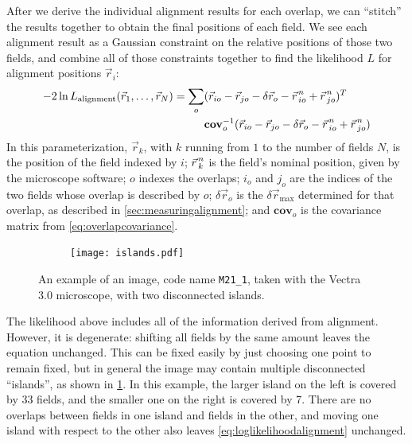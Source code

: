 \documentclass{article}
\newcommand{\svec}[1]{{\vec{#1}\mkern2mu\vphantom{#1}}}
\newcommand{\matrixbold}[1]{\mathbf{#1}}
\newcommand{\M}[2]{\texttt{M#1\_#2}}
\begin{document}
After we derive the individual alignment results for each overlap, we can ``stitch'' the results together to obtain the final positions of each field.  We see each alignment result as a Gaussian constraint on the relative positions of those two fields, and combine all of those constraints together to find the likelihood $L$ for alignment positions $\vec{r}_i$:
\begin{align}
\begin{aligned}
-2\ln L_\text{alignment}(\vec{r}_1, \ldots, \vec{r}_N)=
\sum_{o}&(\vec{r}_{io} - \vec{r}_{jo} - \delta\vec{r}_o - \svec{r}_{io}^n + \svec{r}_{jo}^n)^T \\
&\matrixbold{cov}_o^{-1}
(\vec{r}_{io} - \vec{r}_{jo} - \delta\vec{r}_o - \svec{r}_{io}^n + \svec{r}_{jo}^n)
\end{aligned}
\label{eq:loglikelihoodalignment}
\end{align}
In this parameterization, $\vec{r}_k$, with $k$ running from $1$ to the number of fields $N$, is the position of the field indexed by $i$; $\svec{r}_k^n$ is the field's nominal position, given by the microscope software; $o$ indexes the overlaps; $i_o$ and $j_o$ are the indices of the two fields whose overlap is described by $o$; $\delta\vec{r}_o$ is the $\delta\vec{r}_\text{max}$ determined for that overlap, as described in \cref{sec:measuringalignment}; and $\matrixbold{cov}_o$ is the covariance matrix from \cref{eq:overlapcovariance}.

\begin{figure}[ht]
	\centering
	\begin{subfigure}{0.45\linewidth}
		\texttt{[image: islands.pdf]}
	\end{subfigure}
	\caption{An example of an image, code name \M{21}1, taken with the Vectra 3.0 microscope, with two disconnected islands.}
	\label{fig:islands}
\end{figure}

The likelihood above includes all of the information derived from alignment.  However, it is degenerate: shifting all fields by the same amount leaves the equation unchanged.  This can be fixed easily by just choosing one point to remain fixed, but in general the image may contain multiple disconnected ``islands'', as shown in \cref{fig:islands}.  In this example, the larger island on the left is covered by 33 fields, and the smaller one on the right is covered by 7.  There are no overlaps between fields in one island and fields in the other, and moving one island with respect to the other also leaves \cref{eq:loglikelihoodalignment} unchanged.
\end{document}
